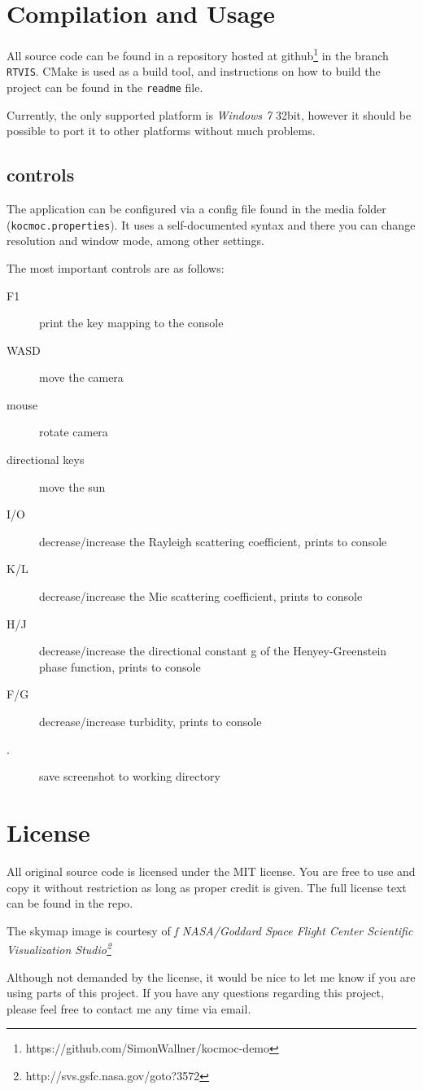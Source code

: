 \documentclass[12pt,a4paper]{scrartcl}
\begin{document}
\section{Compilation and Usage}
All source code can be found in a repository hosted at github\footnote{https://github.com/SimonWallner/kocmoc-demo} in the branch \texttt{RTVIS}. CMake is used as a build tool, and instructions on how to build the project can be found in the \texttt{readme} file.

Currently, the only supported platform is \emph{Windows 7} 32bit, however it should be possible to port it to other platforms without much problems. 

\subsection{controls}
The application can be configured via a config file found in the media folder\\ (\texttt{kocmoc.properties}). It uses a self-documented syntax and there you can change resolution and window mode, among other settings. 

The most important controls are as follows:

\begin{description}
\item[F1] print the key mapping to the console
\item[WASD] move the camera
\item[mouse] rotate camera
\item[directional keys] move the sun
\item[I/O] decrease/increase the Rayleigh scattering coefficient, prints to console
\item[K/L] decrease/increase the Mie scattering coefficient, prints to console
\item[H/J] decrease/increase the directional constant g of the Henyey-Greenstein phase function, prints to console
\item[F/G] decrease/increase turbidity, prints to console
\item[.] save screenshot to working directory

\end{description}

\section{License}
All original source code is licensed under the MIT license. You are free to use and copy it without restriction as long as proper credit is given. The full license text can be found in the repo.

The skymap image is courtesy of \emph{f NASA/Goddard Space Flight Center Scientific Visualization Studio\footnote{http://svs.gsfc.nasa.gov/goto?3572}}

Although not demanded by the license, it would be nice to let me know if you are using parts of this project. If you have any questions regarding this project, please feel free to contact me any time via email.






\end{document}
